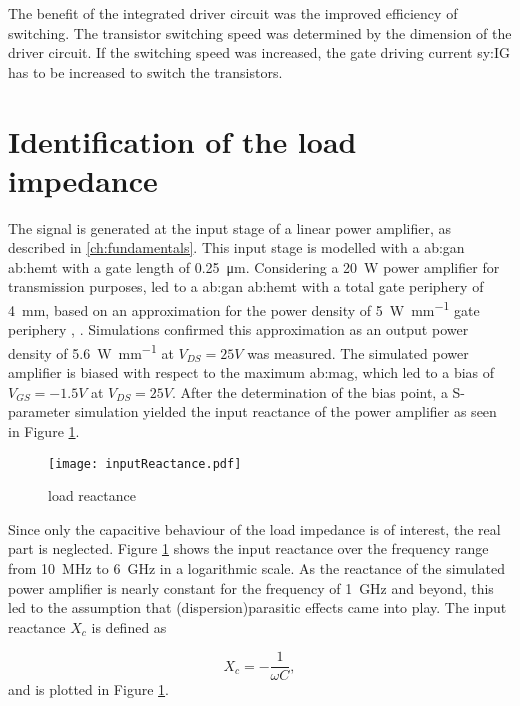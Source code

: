 The benefit of the integrated driver circuit was the improved efficiency of switching.
The transistor switching speed was determined by the dimension of the driver circuit.
If the switching speed was increased, the gate driving current \gls{sy:IG} has to be increased to switch the transistors.
 
\section{Identification of the load impedance}
The signal is generated at the input stage of a linear power amplifier, as described in \ref{ch:fundamentals}.
This input stage is modelled with a \gls{ab:gan} \gls{ab:hemt} with a gate length of \SI{0.25}{\micro \meter}.
Considering a \SI{20}{\watt} power amplifier for transmission purposes, led to a \gls{ab:gan} \gls{ab:hemt} with a total gate periphery of \SI{4}{\milli \metre}, based on an approximation for the power density of \SI[per-mode=fraction]{5}{\watt\per\milli\metre} gate periphery  \cite{Maroldt2010}, \cite{GaNBook}.
Simulations confirmed this approximation as an output power density of \SI[per-mode=fraction]{5.6}{\watt\per\milli\metre} at $V_{DS} = 25 V$ was measured.
The simulated power amplifier is biased with respect to the maximum \gls{ab:mag}, which led to a bias of $V_{GS} = -1.5 V$ at $V_{DS} = 25 V$.
After the determination of the bias point, a S-parameter simulation yielded the input reactance of the power amplifier as seen in Figure \ref{fig:inputReactance}.

\begin{figure}[ht]
	\centering
  \texttt{[image: inputReactance.pdf]}
	\caption{load reactance}
	\label{fig:inputReactance}
\end{figure}

Since only the capacitive behaviour of the load impedance is of interest, the real part is neglected.
Figure \ref{fig:inputReactance} shows the input reactance over the frequency range from \SI{10}{\mega \hertz} to \SI{6}{\giga \hertz} in a logarithmic scale.
As the reactance of the simulated power amplifier is nearly constant for the frequency of \SI{1}{\giga \hertz} and beyond, this led to the assumption that (dispersion)parasitic effects came into play.
The input reactance $X_c$ is defined as

\begin{equation}
	X_c = -\frac{1}{\omega C},
\end{equation}
\label{eq:reactance}
and is plotted in Figure \ref{fig:inputReactance}.


